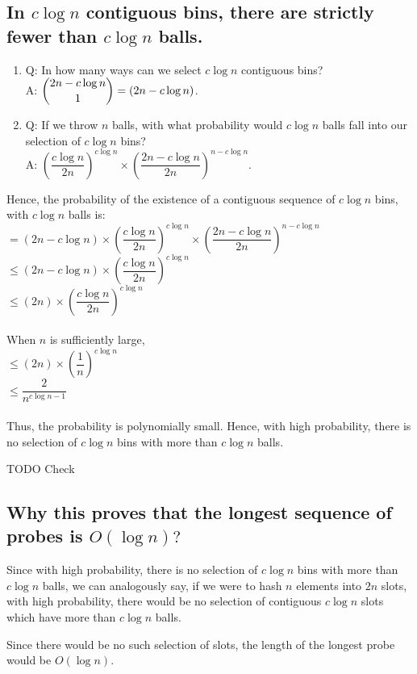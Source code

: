 \documentclass{article}
\begin{document}
\subsection{In $c\log{n}$ contiguous bins, there are strictly
fewer than $c\log{n}$ balls.}
\begin{enumerate}
\item Q: In how many ways can we select $c\log{n}$
contiguous bins?\\
A: $\dbinom{2n-c\log{n}}{1}  = (2n-c\log{n})$.
\item Q: If we throw $n$ balls, with what probability
would $c\log{n}$ balls fall into our selection of $c\log{n}$
bins?\\
A: $\left(\dfrac{c\log{n}}{2n}\right)^{c\log{n}} \times 
\left( \dfrac{2n-c\log{n}}{2n} \right) ^{n-c\log{n}}$.
\end{enumerate}

Hence, the probability of the existence of a contiguous
sequence of $c\log{n}$ bins, with $c\log{n}$ balls is: \\
$ = (2n-c\log{n}) \times \left(\dfrac{c\log{n}}{2n}\right)^{c\log{n}} \times 
\left( \dfrac{2n-c\log{n}}{2n} \right) ^{n-c\log{n}}$ \\
$ \leq (2n-c\log{n}) \times \left(\dfrac{c\log{n}}{2n}\right)^{c\log{n}}$ \\
$ \leq (2n) \times \left( \dfrac{c\log{n}}{2n}\right)^{c\log{n}} $ \\
\\ When $n$ is sufficiently large, \\
$ \leq (2n) \times \left( \dfrac{1}{n} \right)^{c\log{n}}$ \\
$ \leq \dfrac{2}{n^{c\log{n}-1}} $ \\
\\ Thus, the probability is polynomially small. Hence, with high
probability, there is no selection of $c\log{n}$ bins with
more than $c\log{n}$ balls.

TODO Check

\subsection{Why this proves that the longest sequence of probes
is $O(\log{n})?$}
Since with high probability, there is no selection of $c\log{n}$ 
bins with more than $c\log{n}$ balls, we can analogously say,
if we were to hash $n$ elements into $2n$ slots, with high 
probability, there would be no selection of contiguous $c\log{n}$ 
slots which have more than $c\log{n}$ balls. 

Since there would be no such selection of slots, the length of
the longest probe would be $O(\log{n})$.
\clearpage
\end{document}
